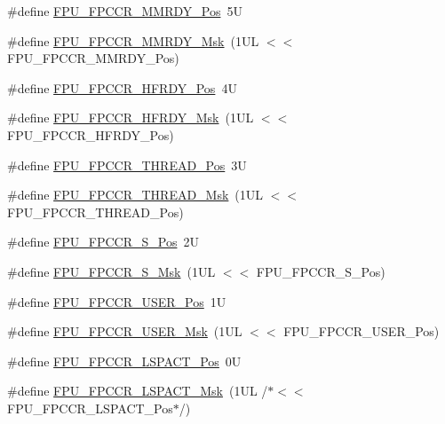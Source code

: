 \begin{DoxyCompactItemize}
\#define \hyperlink{group___c_m_s_i_s___f_p_u_gaccdb481211629f9440431439231187f1}{F\+P\+U\+\_\+\+F\+P\+C\+C\+R\+\_\+\+M\+M\+R\+D\+Y\+\_\+\+Pos}~5U
\item 
\#define \hyperlink{group___c_m_s_i_s___f_p_u_gadedfaec9fdd07261573e823a4dcfb5c4}{F\+P\+U\+\_\+\+F\+P\+C\+C\+R\+\_\+\+M\+M\+R\+D\+Y\+\_\+\+Msk}~(1\+U\+L $<$$<$ F\+P\+U\+\_\+\+F\+P\+C\+C\+R\+\_\+\+M\+M\+R\+D\+Y\+\_\+\+Pos)
\item 
\#define \hyperlink{group___c_m_s_i_s___f_p_u_gab12733991487acc2da41ca300fe36fb6}{F\+P\+U\+\_\+\+F\+P\+C\+C\+R\+\_\+\+H\+F\+R\+D\+Y\+\_\+\+Pos}~4U
\item 
\#define \hyperlink{group___c_m_s_i_s___f_p_u_gaf4beaa279abff34828344bd594fff8a1}{F\+P\+U\+\_\+\+F\+P\+C\+C\+R\+\_\+\+H\+F\+R\+D\+Y\+\_\+\+Msk}~(1\+U\+L $<$$<$ F\+P\+U\+\_\+\+F\+P\+C\+C\+R\+\_\+\+H\+F\+R\+D\+Y\+\_\+\+Pos)
\item 
\#define \hyperlink{group___c_m_s_i_s___f_p_u_ga0937d64c42374200af44b22e5b49fd26}{F\+P\+U\+\_\+\+F\+P\+C\+C\+R\+\_\+\+T\+H\+R\+E\+A\+D\+\_\+\+Pos}~3U
\item 
\#define \hyperlink{group___c_m_s_i_s___f_p_u_ga8d18cd88336d63d4b1810383aa8da700}{F\+P\+U\+\_\+\+F\+P\+C\+C\+R\+\_\+\+T\+H\+R\+E\+A\+D\+\_\+\+Msk}~(1\+U\+L $<$$<$ F\+P\+U\+\_\+\+F\+P\+C\+C\+R\+\_\+\+T\+H\+R\+E\+A\+D\+\_\+\+Pos)
\item 
\#define \hyperlink{group___c_m_s_i_s___f_p_u_ga4123d3881e5342251f559cec19e23b4e}{F\+P\+U\+\_\+\+F\+P\+C\+C\+R\+\_\+\+S\+\_\+\+Pos}~2U
\item 
\#define \hyperlink{group___c_m_s_i_s___f_p_u_ga47d3d3b29514c7d7581cfcc304368cea}{F\+P\+U\+\_\+\+F\+P\+C\+C\+R\+\_\+\+S\+\_\+\+Msk}~(1\+U\+L $<$$<$ F\+P\+U\+\_\+\+F\+P\+C\+C\+R\+\_\+\+S\+\_\+\+Pos)
\item 
\#define \hyperlink{group___c_m_s_i_s___f_p_u_gaea663104375ce6be15470e3db294c92d}{F\+P\+U\+\_\+\+F\+P\+C\+C\+R\+\_\+\+U\+S\+E\+R\+\_\+\+Pos}~1U
\item 
\#define \hyperlink{group___c_m_s_i_s___f_p_u_ga2eb70427eeaa7344196219cf5a8620a4}{F\+P\+U\+\_\+\+F\+P\+C\+C\+R\+\_\+\+U\+S\+E\+R\+\_\+\+Msk}~(1\+U\+L $<$$<$ F\+P\+U\+\_\+\+F\+P\+C\+C\+R\+\_\+\+U\+S\+E\+R\+\_\+\+Pos)
\item 
\#define \hyperlink{group___c_m_s_i_s___f_p_u_ga803bf3f6d15b04deaad0801bee5b35ed}{F\+P\+U\+\_\+\+F\+P\+C\+C\+R\+\_\+\+L\+S\+P\+A\+C\+T\+\_\+\+Pos}~0U
\item 
\#define \hyperlink{group___c_m_s_i_s___f_p_u_ga86e7c2fa52ba65c3b535dfa33f2586eb}{F\+P\+U\+\_\+\+F\+P\+C\+C\+R\+\_\+\+L\+S\+P\+A\+C\+T\+\_\+\+Msk}~(1\+U\+L /$\ast$$<$$<$ F\+P\+U\+\_\+\+F\+P\+C\+C\+R\+\_\+\+L\+S\+P\+A\+C\+T\+\_\+\+Pos$\ast$/)
$$
\end{DoxyCompactItemize}
